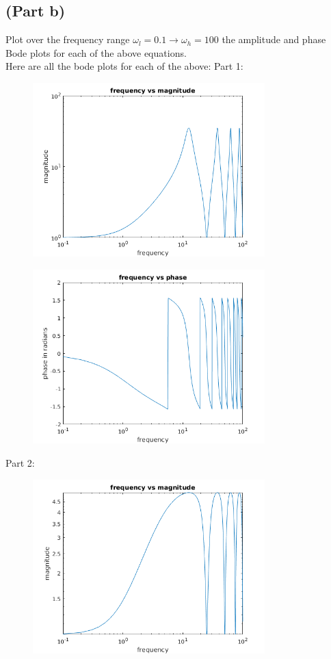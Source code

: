 \documentclass{article}
\begin{document}
\subsection*{(Part b)}
Plot over the frequency range $\omega_l=0.1\to\omega_h=100$ the amplitude and phase Bode plots for each of the above equations.\\
Here are all the bode plots for each of the above:
Part 1:
\begin{figure}[H]
    \centering
    \includegraphics[width=0.8\textwidth]{PR3_amp.png}
\end{figure}
\begin{figure}[H]
    \centering
    \includegraphics[width=0.8\textwidth]{PR3_1phase.png}
\end{figure}
Part 2:
\begin{figure}[H]
    \centering
    \includegraphics[width=0.8\textwidth]{PR3_2amp.png}
\end{figure}
\end{document}
